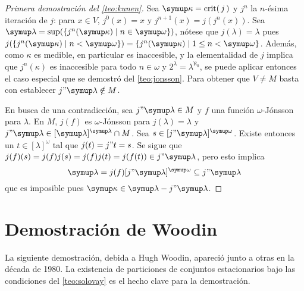 \begin{proof}[Primera demostración del \cref{teo:kunen}]
    Sea $\kappa=\crit{j}$ y $j^n$ la $n$-ésima iteración de $j$: para $x\in V$, $j^0(x)=x$
    y $j^{n+1}(x) = j(j^{n}(x))$. Sea $\lambda=\sup(\set{j^n(\kappa)\mid n\in\omega})$,
    nótese que $j(\lambda)=\lambda$ pues $j(\set{j^n(\kappa)\mid n<\omega}) = \set{j^n(\kappa)\mid 1\leq n<\omega}$.
    Además, como $\kappa$ es medible, en particular es inaccesible, y la elementalidad de $j$ implica que $j^n(\kappa)$
    es inaccesible para todo $n\in\omega$ y $2^\lambda = \lambda^{\aleph_0}$, se puede aplicar entonces
    el caso especial que se demostró del \cref{teo:jonsson}.
    Para obtener que $V\neq M$ basta con establecer $j"\lambda\notin M$.

    En busca de una contradicción, sea $j"\lambda\in M$ y $f$ una función $\omega$-Jónsson para $\lambda$.
    En $M$, $j(f)$ es $\omega$-Jónsson para $j(\lambda)=\lambda$ y $j"\lambda\in[\lambda]^\lambda\cap M$.
    Sea $s\in[j"\lambda]^\omega$. Existe entonces un $t\in[\lambda]^\omega$ tal que $j(t)=j"t=s$.
    Se sigue que $j(f)(s) = j(f)j(s) = j(f)j(t) = j(f(t))\in j"\lambda$, pero esto implica
    \[
        \lambda = j(f)[j"\lambda]^\omega \subseteq j"\lambda
    \]
    que es imposible pues $\kappa\in\lambda- j"\lambda$.
\end{proof}

\section{Demostración de Woodin}

La siguiente demostración, debida a Hugh Woodin, apareció junto a otras en
la década de 1980. La existencia de particiones de conjuntos estacionarios
bajo las condiciones del \cref{teo:solovay} es el hecho clave para la demostración.

